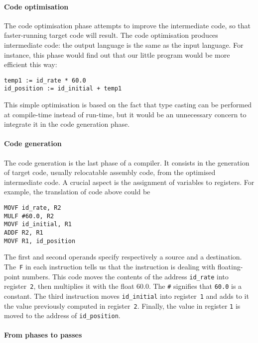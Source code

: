 \paragraph{Code optimisation}
\label{opt_code}

The code optimisation phase attempts to improve the intermediate code,
so that faster-running target code will result. The code optimisation
produces intermediate code: the output language is the same as the
input language. For instance, this phase would find out that our
little program would be more efficient this way:
\begin{verbatim}
temp1 := id_rate * 60.0
id_position := id_initial + temp1
\end{verbatim}
\noindent This simple optimisation is based on the fact that type
casting can be performed at compile-time instead of run-time, but it
would be an unnecessary concern to integrate it in the code generation
phase.

\paragraph{Code generation}

The code generation is the last phase of a compiler. It consists in
the generation of target code, usually relocatable assembly code, from
the optimised intermediate code. A crucial aspect is the assignment of
variables to registers. For example, the translation of code above
could be
\begin{verbatim}
MOVF id_rate, R2
MULF #60.0, R2
MOVF id_initial, R1
ADDF R2, R1
MOVF R1, id_position
\end{verbatim}
The first and second operands specify respectively a source and a
destination. The~\texttt{F} in each instruction tells us that the
instruction is dealing with floating-point numbers. This code moves
the contents of the address \texttt{id\_rate} into
register~\texttt{2}, then multiplies it with the float 60.0. The
\texttt{\#} signifies that \texttt{60.0} is a constant. The third
instruction moves \texttt{id\_initial} into register~\texttt{1} and
adds to it the value previously computed in
register~\texttt{2}. Finally, the value in register \texttt{1} is
moved to the address of \texttt{id\_position}.

\paragraph{From phases to passes}

